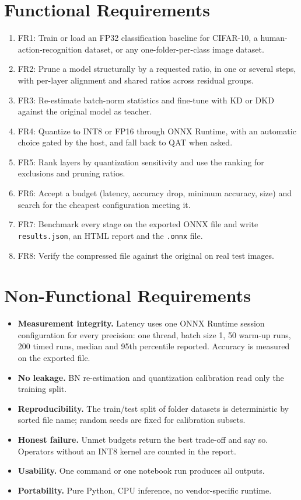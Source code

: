 \documentclass[oneside,a4paper,12pt]{report}
\newcommand{\code}[1]{\texttt{\small #1}}
\begin{document}
\section{Functional Requirements}
\begin{enumerate}
\item FR1: Train or load an FP32 classification baseline for CIFAR-10, a human-action-recognition dataset, or any one-folder-per-class image dataset.
\item FR2: Prune a model structurally by a requested ratio, in one or several steps, with per-layer alignment and shared ratios across residual groups.
\item FR3: Re-estimate batch-norm statistics and fine-tune with KD or DKD against the original model as teacher.
\item FR4: Quantize to INT8 or FP16 through ONNX Runtime, with an automatic choice gated by the host, and fall back to QAT when asked.
\item FR5: Rank layers by quantization sensitivity and use the ranking for exclusions and pruning ratios.
\item FR6: Accept a budget (latency, accuracy drop, minimum accuracy, size) and search for the cheapest configuration meeting it.
\item FR7: Benchmark every stage on the exported ONNX file and write \code{results.json}, an HTML report and the \code{.onnx} file.
\item FR8: Verify the compressed file against the original on real test images.
\end{enumerate}

\section{Non-Functional Requirements}
\begin{itemize}
\item \textbf{Measurement integrity.} Latency uses one ONNX Runtime session configuration for every precision: one thread, batch size 1, 50 warm-up runs, 200 timed runs, median and 95th percentile reported. Accuracy is measured on the exported file.
\item \textbf{No leakage.} BN re-estimation and quantization calibration read only the training split.
\item \textbf{Reproducibility.} The train/test split of folder datasets is deterministic by sorted file name; random seeds are fixed for calibration subsets.
\item \textbf{Honest failure.} Unmet budgets return the best trade-off and say so. Operators without an INT8 kernel are counted in the report.
\item \textbf{Usability.} One command or one notebook run produces all outputs.
\item \textbf{Portability.} Pure Python, CPU inference, no vendor-specific runtime.
\end{itemize}
\end{document}
